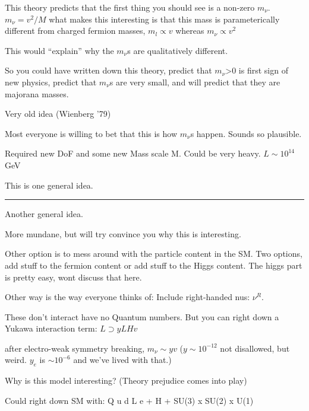 {This theory predicts that the first thing you should see is a non-zero $m_\nu$. 
\bc
$m_\nu = v^2 / M$
\ec
what makes this interesting is that this mass is parameterically different from charged fermion masses, 
\bc
 $m_l \propto v$   whereas $m_\nu \propto v^2$
\ec

This would ``explain'' why the $m_\nu$s are qualitatively different. 

So you could have written down this theory,  predict that $m_\nu$>0 is first sign of new physics, predict that $m_\nu$s are very small, and will predict that they are majorana masses. 

Very old idea (Wienberg '79) 

Most everyone is willing to bet that this is how $m_\nu$s happen. 
Sounds so plausible.

Required new DoF and some new Mass scale M.  
Could be very heavy.
$L \sim 10^{14}$ GeV 

This is one general idea. 

\noindent\rule{\textwidth}{1pt} 

Another general idea. 

More mundane, but will try convince you why this is interesting. 


Other option is to mess around with the particle content in the SM.
Two options, add stuff to the fermion content or add stuff to the Higgs content. 
The higgs part is pretty easy, wont discuss that here.

%
%

Other way is the way everyone thinks of: Include right-handed nus:   $\nu^R$. 

These don't interact have no Quantum numbers. 
But you can right down a Yukawa interaction term:
\bc
$L \supset  y LHv $
\ec

after electro-weak symmetry breaking, 
$m_\nu  \sim y v$    ($y \sim10^{-12}$ not disallowed,  but weird. $y_e$ is $\sim10^{-6}$ and we've lived with that.)

Why is this model interesting? 
(Theory prejudice comes into play)

Could right down SM with: 
Q u d L e  + H + SU(3) x SU(2) x U(1)

}
